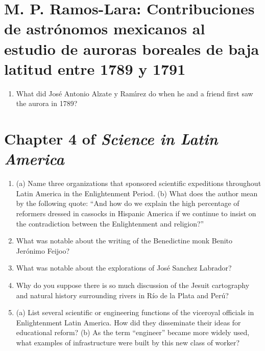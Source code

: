 \documentclass[12pt]{article}
\begin{document}
\maketitle

\small

\section{M. P. Ramos-Lara: Contribuciones de astr\'{o}nomos mexicanos al estudio de auroras boreales de baja latitud entre 1789 y 1791}

\begin{enumerate}
\item What did Jos\'{e} Antonio Alzate y Ram\'{ı}rez do when he and a friend first saw the aurora in 1789? \\ \vspace{0.75cm}
\end{enumerate}

\section{Chapter 4 of \textit{Science in Latin America}}

\begin{enumerate}
\item (a) Name three organizations that sponsored scientific expeditions throughout Latin America in the Enlightenment Period.  (b) What does the author mean by the following quote: ``And how do we explain the high percentage of reformers dressed in cassocks in Hispanic America if we continue to insist on the contradiction between the Enlightenment and religion?'' \\ \vspace{1.25cm}
\item What was notable about the writing of the Benedictine monk Benito Jer\'{o}nimo Feijoo? \\ \vspace{1cm}
\item What was notable about the explorations of Jos\'{e} Sanchez Labrador? \\ \vspace{1cm}
\item Why do you suppose there is so much discussion of the Jesuit cartography and natural history surrounding rivers in R\'{i}o de la Plata and Per\'{u}? \\ \vspace{1cm}
\item (a) List several scientific or engineering functions of the viceroyal officials in Enlightenment Latin America.  How did they disseminate their ideas for educational reform? (b) As the term ``engineer'' became more widely used, what examples of infrastructure were built by this new class of worker? \\ \vspace{1cm}
\end{enumerate}
\end{document}
